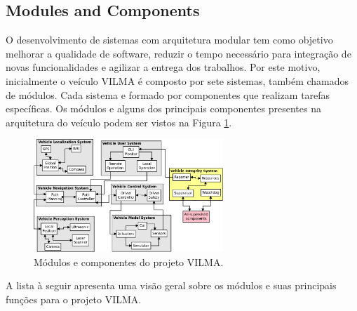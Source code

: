 \documentclass[conference]{IEEEtran}
\begin{document}


%
\subsection{Modules and Components}\label{subsec:modules_components}
O desenvolvimento de sistemas com arquitetura modular tem como objetivo melhorar a qualidade de software, reduzir o tempo necessário para integração de novas funcionalidades e agilizar a entrega dos trabalhos. Por este motivo, inicialmente o veículo VILMA é composto por sete sistemas, também chamados de módulos. Cada sistema e formado por componentes que realizam tarefas específicas. Os módulos e alguns dos principais componentes presentes na arquitetura do veículo podem ser vistos na Figura \ref{fig:VILMA_MODULES_COMPONENTS}.

\begin{figure}[h]
	\centering
	\includegraphics[width=270px,keepaspectratio]{imagens/VILMA_MODULES_COMPONENTS}
	\caption{Módulos e componentes do projeto VILMA.}
	\label{fig:VILMA_MODULES_COMPONENTS}
\end{figure}

A lista à seguir apresenta uma visão geral sobre os módulos e suas principais funções para o projeto VILMA.
\end{document}
